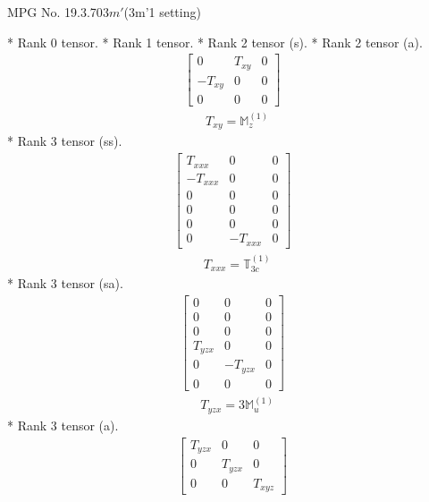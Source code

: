 \documentclass[fleqn,8pt,landscape]{jsarticle}
\begin{document}
\setcounter{MaxMatrixCols}{32}

\renewcommand{\tablename}{Table~}
\renewcommand{\figurename}{Figure~}
\begin{center}
\LARGE
MPG No. 19.3.70\quad$3m'$\quad(3m'1 setting)
\end{center}
* Rank 0 tensor.
* Rank 1 tensor.
* Rank 2 tensor (s).
* Rank 2 tensor (a).
\begin{align*}
\begin{bmatrix} 0 & T_{xy} & 0 \\ - T_{xy} & 0 & 0 \\ 0 & 0 & 0 \end{bmatrix}
\end{align*}
\begin{align*}
& T_{xy} = \mathbb{M}_{z}^{(1)}
\end{align*}
* Rank 3 tensor (ss).
\begin{align*}
\begin{bmatrix} T_{xxx} & 0 & 0 \\ - T_{xxx} & 0 & 0 \\ 0 & 0 & 0 \\ 0 & 0 & 0 \\ 0 & 0 & 0 \\ 0 & - T_{xxx} & 0 \end{bmatrix}
\end{align*}
\begin{align*}
& T_{xxx} = \mathbb{T}_{3c}^{(1)}
\end{align*}
* Rank 3 tensor (sa).
\begin{align*}
\begin{bmatrix} 0 & 0 & 0 \\ 0 & 0 & 0 \\ 0 & 0 & 0 \\ T_{yzx} & 0 & 0 \\ 0 & - T_{yzx} & 0 \\ 0 & 0 & 0 \end{bmatrix}
\end{align*}
\begin{align*}
& T_{yzx} = 3 \mathbb{M}_{u}^{(1)}
\end{align*}
* Rank 3 tensor (a).
\begin{align*}
\begin{bmatrix} T_{yzx} & 0 & 0 \\ 0 & T_{yzx} & 0 \\ 0 & 0 & T_{xyz} \end{bmatrix}
\end{align*}
\end{document}
